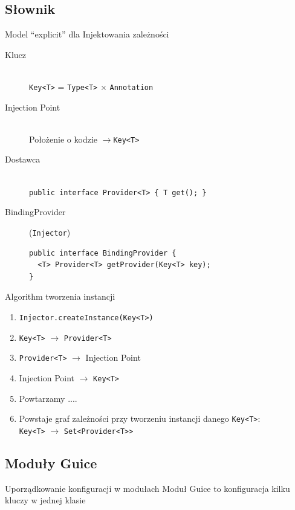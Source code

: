 \documentclass[smaller]{beamer}
\begin{document}
\subsection{Słownik}
\begin{frame}[fragile]{Model ``explicit'' dla Injektowania zależności}

\begin{description}
 \item[Klucz] \hfill \\ 
 \lstinline|Key<T>|  =  \lstinline|Type<T>| $\times$ \lstinline|Annotation|
 \item[Injection Point] \hfill \\
 Położenie o kodzie $\rightarrow$\lstinline|Key<T>|
 \item[Dostawca]  \hfill \\
 \lstinline|public interface Provider<T> { T get(); }|
 \item[BindingProvider] (\lstinline|Injector|) \hfill \\
\begin{lstlisting}
public interface BindingProvider {
  <T> Provider<T> getProvider(Key<T> key);
}
\end{lstlisting}
\end{description}
\end{frame}

\begin{frame}{Algorithm tworzenia instancji}
 \begin{enumerate}
  \item<1-> \lstinline|Injector.createInstance(Key<T>)|
  \item<2-> \lstinline|Key<T>| $\rightarrow$ \lstinline|Provider<T>|
  \item<3-> \lstinline|Provider<T>| $\rightarrow$ Injection Point
  \item<4->  Injection Point $\rightarrow$ \lstinline|Key<T>|
  \item<5->  Powtarzamy ....
  \item<6->  Powstaje graf zależności przy tworzeniu instancji danego \lstinline|Key<T>|: \\
\lstinline|Key<T>| $\rightarrow$ \lstinline|Set<Provider<T>>|

 \end{enumerate}
\end{frame}

\subsection{Moduły Guice}
\begin{frame}{Uporządkowanie konfiguracji w modułach}
Moduł Guice to konfiguracja kilku kluczy w jednej klasie

\end{frame}
\end{document}
